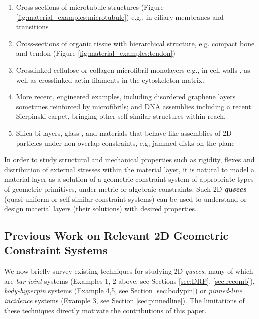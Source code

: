 \begin{enumerate}
    \item Cross-sections of microtubule structures (Figure \ref{fig:material_examples:microtubule}) \cite{Necklace1} e.g., in ciliary membranes and transitions \cite{Necklace2}

    \item Cross-sections of organic tissue with hierarchical structure, e.g. compact bone and tendon (Figure \ref{fig:material_examples:tendon}) \cite{XX}

    \item Crosslinked cellulose or collagen microfibril monolayers e.g., in cell-walls \cite{CellWalls1} \cite{CellWalls1}, as well as crosslinked actin filaments in the cytoskeleton matrix.

    \item More recent, engineered examples, including disordered graphene layers \cite{Graphene1} \cite{Graphene2} sometimes reinforced by  microfibrils; and DNA assemblies \cite{Microfibrils1} including a recent Sierpinski carpet, bringing other self-similar structures \cite{Microfibrils2} within reach.

    \item Silica bi-layers, glass \cite{SilicaGlass1} \cite{SilicaGlass2}, and materials that behave like assemblies of 2D particles under non-overlap constraints, e.g, jammed disks on the plane \cite{JammedDisk1}
\end{enumerate}
%
In order to study structural and mechanical properties such as
rigidity, flexes and distribution of external stresses within the
material layer, it is natural to model a material layer as a solution
of a geometric constraint system of appropriate types of geometric
primitives, under metric or algebraic constraints. Such 2D {\bf{\em
qusecs}} (quasi-uniform or self-similar constraint systems) can be
used to understand or design material layers (their solutions) with
desired properties.

\subsection{Previous Work on Relevant 2D Geometric Constraint Systems}
We now briefly survey existing techniques for studying 2D
\textit{qusecs},  many of which are \textit{bar-joint} systems
(Examples 1, 2 above, see Sections \ref{sec:DRP}, \ref{sec:recomb}),
\textit{body-hyperpin} systems (Example 4,5, see Section
\ref{sec:bodypin}) or \textit{pinned-line incidence} systems (Example
3, see Section \ref{sec:pinnedline}). The limitations of these
techniques directly motivate the contributions of this paper.

